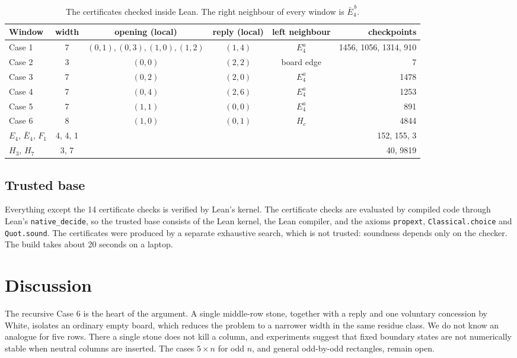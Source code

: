 \documentclass[11pt]{amsart}
\theoremstyle{definition}
\begin{document}
\begin{table}[ht]
\centering\small
\begin{tabular}{@{}l c c c c r@{}}
\toprule
Window & width & opening (local) & reply (local) & left neighbour & checkpoints\\
\midrule
Case 1 & 7 & $(0,1),(0,3),(1,0),(1,2)$ & $(1,4)$ & $E_4^a$ & 1456, 1056, 1314, 910\\
Case 2 & 3 & $(0,0)$ & $(2,2)$ & board edge & 7\\
Case 3 & 7 & $(0,2)$ & $(2,0)$ & $E_4^a$ & 1478\\
Case 4 & 7 & $(0,4)$ & $(2,6)$ & $E_4^a$ & 1253\\
Case 5 & 7 & $(1,1)$ & $(0,0)$ & $E_4^a$ & 891\\
Case 6 & 8 & $(1,0)$ & $(0,1)$ & $H_c$ & 4844\\
\midrule
$E_4$, $\bar E_4$, $F_1$ & 4, 4, 1 & & & & 152, 155, 3\\
$H_3$, $H_7$ & 3, 7 & & & & 40, 9819\\
\bottomrule
\end{tabular}
\caption{The certificates checked inside Lean. The right neighbour of every
window is $\bar E_4^{\,b}$.}
\label{tab:leanwindows}
\end{table}

\subsection*{Trusted base}
Everything except the 14 certificate checks is verified by Lean's kernel. The
certificate checks are evaluated by compiled code through Lean's
\texttt{native\_decide}, so the trusted base consists of the Lean kernel, the
Lean compiler, and the axioms \texttt{propext}, \texttt{Classical.choice} and
\texttt{Quot.sound}. The certificates were produced by a separate exhaustive
search, which is not trusted: soundness depends only on the checker. The
build takes about 20 seconds on a laptop.

\section{Discussion}\label{sec:discussion}

The recursive Case 6 is the heart of the argument. A single middle-row stone,
together with a reply and one voluntary concession by White, isolates an
ordinary empty board, which reduces the problem to a narrower width in the
same residue class. We do not know an analogue for five rows. There a single
stone does not kill a column, and experiments suggest that fixed boundary
states are not numerically stable when neutral columns are inserted. The
cases $5\times n$ for odd $n$, and general odd-by-odd rectangles, remain open.
\end{document}
